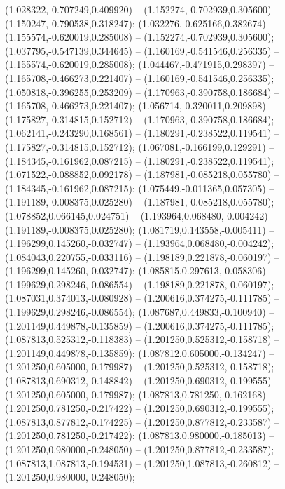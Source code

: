  (1.028322,-0.707249,0.409920) -- (1.152274,-0.702939,0.305600) -- (1.150247,-0.790538,0.318247);
 (1.032276,-0.625166,0.382674) -- (1.155574,-0.620019,0.285008) -- (1.152274,-0.702939,0.305600);
 (1.037795,-0.547139,0.344645) -- (1.160169,-0.541546,0.256335) -- (1.155574,-0.620019,0.285008);
 (1.044467,-0.471915,0.298397) -- (1.165708,-0.466273,0.221407) -- (1.160169,-0.541546,0.256335);
 (1.050818,-0.396255,0.253209) -- (1.170963,-0.390758,0.186684) -- (1.165708,-0.466273,0.221407);
 (1.056714,-0.320011,0.209898) -- (1.175827,-0.314815,0.152712) -- (1.170963,-0.390758,0.186684);
 (1.062141,-0.243290,0.168561) -- (1.180291,-0.238522,0.119541) -- (1.175827,-0.314815,0.152712);
 (1.067081,-0.166199,0.129291) -- (1.184345,-0.161962,0.087215) -- (1.180291,-0.238522,0.119541);
 (1.071522,-0.088852,0.092178) -- (1.187981,-0.085218,0.055780) -- (1.184345,-0.161962,0.087215);
 (1.075449,-0.011365,0.057305) -- (1.191189,-0.008375,0.025280) -- (1.187981,-0.085218,0.055780);
 (1.078852,0.066145,0.024751) -- (1.193964,0.068480,-0.004242) -- (1.191189,-0.008375,0.025280);
 (1.081719,0.143558,-0.005411) -- (1.196299,0.145260,-0.032747) -- (1.193964,0.068480,-0.004242);
 (1.084043,0.220755,-0.033116) -- (1.198189,0.221878,-0.060197) -- (1.196299,0.145260,-0.032747);
 (1.085815,0.297613,-0.058306) -- (1.199629,0.298246,-0.086554) -- (1.198189,0.221878,-0.060197);
 (1.087031,0.374013,-0.080928) -- (1.200616,0.374275,-0.111785) -- (1.199629,0.298246,-0.086554);
 (1.087687,0.449833,-0.100940) -- (1.201149,0.449878,-0.135859) -- (1.200616,0.374275,-0.111785);
 (1.087813,0.525312,-0.118383) -- (1.201250,0.525312,-0.158718) -- (1.201149,0.449878,-0.135859);
 (1.087812,0.605000,-0.134247) -- (1.201250,0.605000,-0.179987) -- (1.201250,0.525312,-0.158718);
 (1.087813,0.690312,-0.148842) -- (1.201250,0.690312,-0.199555) -- (1.201250,0.605000,-0.179987);
 (1.087813,0.781250,-0.162168) -- (1.201250,0.781250,-0.217422) -- (1.201250,0.690312,-0.199555);
 (1.087813,0.877812,-0.174225) -- (1.201250,0.877812,-0.233587) -- (1.201250,0.781250,-0.217422);
 (1.087813,0.980000,-0.185013) -- (1.201250,0.980000,-0.248050) -- (1.201250,0.877812,-0.233587);
 (1.087813,1.087813,-0.194531) -- (1.201250,1.087813,-0.260812) -- (1.201250,0.980000,-0.248050);
